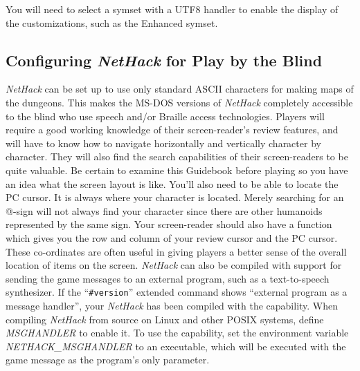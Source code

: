You will need to select a symset with a UTF8 handler to enable the
display of the customizations, such as the Enhanced symset.

\subsection*{Configuring {\it NetHack\/} for Play by the Blind}

{\it NetHack\/} can be set up to use only standard ASCII characters for making
maps of the dungeons. This makes the MS-DOS versions of {\it NetHack\/}
completely
accessible to the blind who use speech and/or Braille access technologies.
Players will require a good working knowledge of their screen-reader's
review features, and will have to know how to navigate horizontally and
vertically character by character. They will also find the search
capabilities of their screen-readers to be quite valuable. Be certain to
examine this Guidebook before playing so you have an idea what the screen
layout is like. You'll also need to be able to locate the PC cursor. It is
always where your character is located. Merely searching for an @-sign will
not always find your character since there are other humanoids represented
by the same sign. Your screen-reader should also have a function which
gives you the row and column of your review cursor and the PC cursor.
These co-ordinates are often useful in giving players a better sense of the
overall location of items on the screen.
{\it NetHack\/} can also be compiled with support for sending the game messages
to an external program, such as a text-to-speech synthesizer. If the
``{\tt \#version}'' extended command shows ``external program as a
message handler'', your {\it NetHack\/}
has been compiled with the capability. When compiling {\it NetHack\/}
from source
on Linux and other POSIX systems, define {\it MSGHANDLER\/} to enable it.
To use
the capability, set the environment variable {\it NETHACK\_MSGHANDLER\/} to an
executable, which will be executed with the game message as the program's
only parameter.

